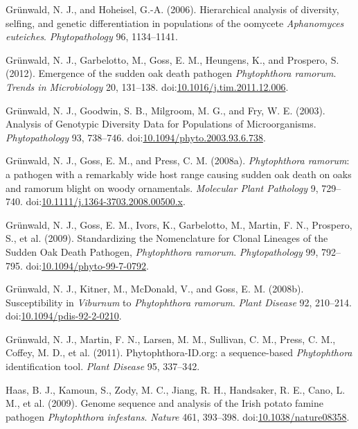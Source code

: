 \documentclass[double,12pt]{beavtex}
\begin{document}
  \hypertarget{ref-grunwald2006hierarchical}{}
  Grünwald, N. J., and Hoheisel, G.-A. (2006). Hierarchical analysis of
  diversity, selfing, and genetic differentiation in populations of the
  oomycete \emph{Aphanomyces euteiches}. \emph{Phytopathology} 96,
  1134--1141.
  
  \hypertarget{ref-grunwald2012emergence}{}
  Grünwald, N. J., Garbelotto, M., Goss, E. M., Heungens, K., and
  Prospero, S. (2012). Emergence of the sudden oak death pathogen
  \emph{Phytophthora ramorum}. \emph{Trends in Microbiology} 20, 131--138.
  doi:\href{https://doi.org/10.1016/j.tim.2011.12.006}{10.1016/j.tim.2011.12.006}.
  
  \hypertarget{ref-grunwald2003analysis}{}
  Grünwald, N. J., Goodwin, S. B., Milgroom, M. G., and Fry, W. E. (2003).
  Analysis of Genotypic Diversity Data for Populations of Microorganisms.
  \emph{Phytopathology} 93, 738--746.
  doi:\href{https://doi.org/10.1094/phyto.2003.93.6.738}{10.1094/phyto.2003.93.6.738}.
  
  \hypertarget{ref-grunwald2008phytophthora}{}
  Grünwald, N. J., Goss, E. M., and Press, C. M. (2008a).
  \emph{Phytophthora ramorum}: a pathogen with a remarkably wide host
  range causing sudden oak death on oaks and ramorum blight on woody
  ornamentals. \emph{Molecular Plant Pathology} 9, 729--740.
  doi:\href{https://doi.org/10.1111/j.1364-3703.2008.00500.x}{10.1111/j.1364-3703.2008.00500.x}.
  
  \hypertarget{ref-grunwald2009standardizing}{}
  Grünwald, N. J., Goss, E. M., Ivors, K., Garbelotto, M., Martin, F. N.,
  Prospero, S., et al. (2009). Standardizing the Nomenclature for Clonal
  Lineages of the Sudden Oak Death Pathogen, \emph{Phytophthora ramorum}.
  \emph{Phytopathology} 99, 792--795.
  doi:\href{https://doi.org/10.1094/phyto-99-7-0792}{10.1094/phyto-99-7-0792}.
  
  \hypertarget{ref-grunwald2008susceptibility}{}
  Grünwald, N. J., Kitner, M., McDonald, V., and Goss, E. M. (2008b).
  Susceptibility in \emph{Viburnum} to \emph{Phytophthora ramorum}.
  \emph{Plant Disease} 92, 210--214.
  doi:\href{https://doi.org/10.1094/pdis-92-2-0210}{10.1094/pdis-92-2-0210}.
  
  \hypertarget{ref-grunwald2011phytophthora}{}
  Grünwald, N. J., Martin, F. N., Larsen, M. M., Sullivan, C. M., Press,
  C. M., Coffey, M. D., et al. (2011). Phytophthora-ID.org: a
  sequence-based \emph{Phytophthora} identification tool. \emph{Plant
  Disease} 95, 337--342.
  
  \hypertarget{ref-haas2009genome}{}
  Haas, B. J., Kamoun, S., Zody, M. C., Jiang, R. H., Handsaker, R. E.,
  Cano, L. M., et al. (2009). Genome sequence and analysis of the Irish
  potato famine pathogen \emph{Phytophthora infestans}. \emph{Nature} 461,
  393--398.
  doi:\href{https://doi.org/10.1038/nature08358}{10.1038/nature08358}.
  
\end{document}

